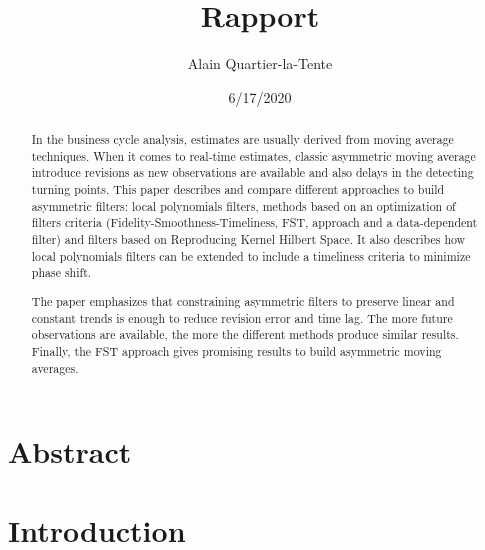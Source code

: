 \documentclass[
  12pt,
  ,
  a4paper]{article}
\title{Rapport}
\author{Alain Quartier-la-Tente}
\date{6/17/2020}
\newcommand\1{\mathds{1}}
\begin{document}
\maketitle

{
\hypersetup{linkcolor=}
\setcounter{tocdepth}{3}
\tableofcontents
}
\newpage

\hypertarget{abstract}{%
\section{Abstract}\label{abstract}}

\begin{abstract}

In the business cycle analysis, estimates are usually derived from moving average techniques. 
When it comes to real-time estimates, classic asymmetric moving average introduce revisions as new observations are available and also delays in the detecting turning points.
This paper describes and compare different approaches to build asymmetric filters: local polynomials filters, methods based on an optimization of filters criteria (Fidelity-Smoothness-Timeliness, FST, approach and a data-dependent filter) and filters based on Reproducing Kernel Hilbert Space.
It also describes how local polynomials filters can be extended to include a timeliness criteria to minimize phase shift.

The paper emphasizes that constraining asymmetric filters to preserve linear and constant trends is enough to reduce revision error and time lag. 
The more future observations are available, the more the different methods produce similar results.
Finally, the FST approach gives promising results to build asymmetric moving averages.
\end{abstract}

\newpage

\hypertarget{introduction}{%
\section{Introduction}\label{introduction}}
\end{document}
